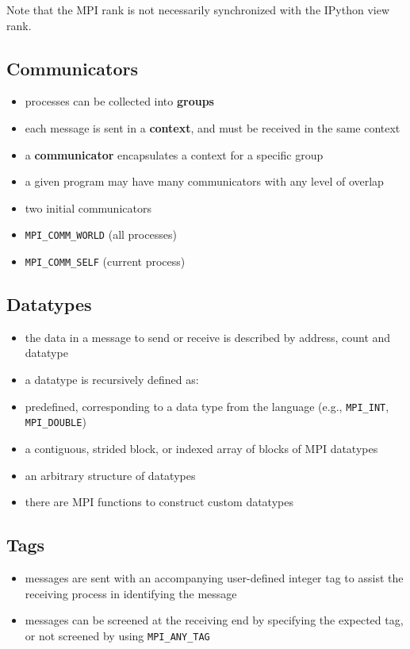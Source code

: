 \documentclass{article}
\begin{document}
    Note that the MPI rank is not necessarily synchronized with the IPython
view rank.

    \subsection{Communicators}\label{communicators}

\begin{itemize}
\item
  processes can be collected into \textbf{groups}
\item
  each message is sent in a \textbf{context}, and must be received in
  the same context
\item
  a \textbf{communicator} encapsulates a context for a specific group
\item
  a given program may have many communicators with any level of overlap
\item
  two initial communicators
\item
  \texttt{MPI\_COMM\_WORLD} (all processes)
\item
  \texttt{MPI\_COMM\_SELF} (current process)
\end{itemize}

    \subsection{Datatypes}\label{datatypes}

\begin{itemize}
\item
  the data in a message to send or receive is described by address,
  count and datatype
\item
  a datatype is recursively defined as:
\item
  predefined, corresponding to a data type from the language (e.g.,
  \texttt{MPI\_INT}, \texttt{MPI\_DOUBLE})
\item
  a contiguous, strided block, or indexed array of blocks of MPI
  datatypes
\item
  an arbitrary structure of datatypes
\item
  there are MPI functions to construct custom datatypes
\end{itemize}

    \subsection{Tags}\label{tags}

\begin{itemize}
\itemsep1pt\parskip0pt
\item
  messages are sent with an accompanying user-defined integer tag to
  assist the receiving process in identifying the message
\item
  messages can be screened at the receiving end by specifying the
  expected tag, or not screened by using \texttt{MPI\_ANY\_TAG}
\end{itemize}
\end{document}
